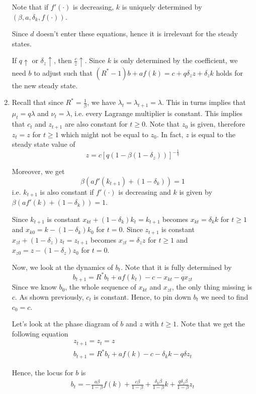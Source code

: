 \documentclass[12pt]{article}
\newcommand{\1}{{\bf 1}} %
\begin{document}
\begin{enumerate}[(1)]
Note that if $f'(\cdot)$ is decreasing, $k$ is uniquely determined by $(\beta,a,\delta_k,f(\cdot))$.

Since $d$ doesn't enter these equations, hence it is irrelevant for the steady states.

If $q\uparrow$ or $\delta_z \uparrow$, then $\frac{c}{z} \uparrow$. Since $k$ is only determined by the coefficient, we need $b$ to adjust such that $(R^*-1)b+af(k)= c+q\delta_zz+\delta_zk$ holds for the new steady state.
	
	\item 
	
	Recall that since $R^*=\frac{1}{\beta}$, we have $\lambda_t = \lambda_{t+1} = \lambda$. This in turns implies that 
	$\mu_t=q\lambda$ and $\nu_t=\lambda$, i.e. every Lagrange multiplier is constant. This implies that $c_t$ and $z_{t+1}$ are also constant for $t\geq 0$. Note that $z_0$ is given, therefore $z_t=z$ for $t\geq 1$ which might not be equal to $z_0$. In fact, $z$ is equal to the steady state value of 
	\[
	z= c[q(1-\beta(1-\delta_z))]^{-\frac{1}{\eta}}
	\]
	
	Moreover, we get
	\[
	\beta(af'(k_{t+1})+(1-\delta_k))=1
	\]
	i.e. $k_{t+1}$ is also constant if $f'(\cdot)$ is decreasing and $k$ is given by $\beta(af'(k)+(1-\delta_k))=1$.
	
	Since $k_{t+1}$ is constant $x_{kt}+(1-\delta_k)k_t= k_{t+1}$ becomes $x_{kt}=\delta_kk$ for $t\geq 1$ and $x_{k0}=k-(1-\delta_k)k_0$ for $t=0$.
	Since $z_{t+1}$ is constant $x_{zt}+(1-\delta_z)z_t= z_{t+1}$ becomes $x_{zt}=\delta_zz$ for $t\geq 1$ and $x_{z0}=z-(1-\delta_z)z_0$ for $t=0$.
	
	Now, we look at the dynamics of $b_t$. Note that it is fully determined by
	\[
	b_{t+1}=R^*b_t+af(k_t)- c-x_{kt}-qx_{zt}
	\]
	Since we know $b_0$, the whole sequence of $x_{kt}$ and $x_{zt}$, the only thing missing is $c$. As shown previously, $c_t$ is constant. Hence, to pin down $b_t$ we need to find $c_0=c$.
	
	Let's look at the phase diagram of $b$ and $z$ with $t\geq 1$. Note that we get the following equation
\begin{align*}
	z_{t+1} = z_t = z\\
	b_{t+1}=R^*b_t+af(k)- c-\delta_k k-q\delta z_t
\end{align*}

Hence, the locus for $b$ is
\begin{align*}
	b_{t}=-\frac{a\beta}{1-\beta}f(k)+ \frac{c\beta}{1-\beta}+ \frac{\delta_k\beta}{1-\beta}k+\frac{q\delta_z\beta}{1-\beta} z_t
\end{align*}


\end{enumerate}
\end{document}
